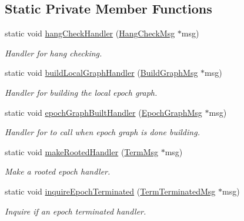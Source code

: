 \subsection*{Static Private Member Functions}
\begin{DoxyCompactItemize}
\item 
static void \hyperlink{structvt_1_1term_1_1_termination_detector_af9fd292c8d1bcc5eba9ee1fb39c29ea2}{hang\+Check\+Handler} (\hyperlink{structvt_1_1term_1_1_hang_check_msg}{Hang\+Check\+Msg} $\ast$msg)
\begin{DoxyCompactList}\small\item\em Handler for hang checking. \end{DoxyCompactList}\item 
static void \hyperlink{structvt_1_1term_1_1_termination_detector_adb3b87cb03a5991e059bb7930ec5d682}{build\+Local\+Graph\+Handler} (\hyperlink{structvt_1_1term_1_1_build_graph_msg}{Build\+Graph\+Msg} $\ast$msg)
\begin{DoxyCompactList}\small\item\em Handler for building the local epoch graph. \end{DoxyCompactList}\item 
static void \hyperlink{structvt_1_1term_1_1_termination_detector_a5a8084f2dc7df36da7e78d088ae8cae9}{epoch\+Graph\+Built\+Handler} (\hyperlink{structvt_1_1term_1_1_termination_detector_aec8abc5a3b161ac7df73ff3ba385dace}{Epoch\+Graph\+Msg} $\ast$msg)
\begin{DoxyCompactList}\small\item\em Handler for to call when epoch graph is done building. \end{DoxyCompactList}\item 
static void \hyperlink{structvt_1_1term_1_1_termination_detector_a3290a7d57d60b0877a39379945303675}{make\+Rooted\+Handler} (\hyperlink{structvt_1_1term_1_1_term_msg}{Term\+Msg} $\ast$msg)
\begin{DoxyCompactList}\small\item\em Make a rooted epoch handler. \end{DoxyCompactList}\item 
static void \hyperlink{structvt_1_1term_1_1_termination_detector_a77d03435714d4abea092f464c42af1f0}{inquire\+Epoch\+Terminated} (\hyperlink{structvt_1_1term_1_1_term_terminated_msg}{Term\+Terminated\+Msg} $\ast$msg)
\begin{DoxyCompactList}\small\item\em Inquire if an epoch terminated handler. \end{DoxyCompactList}\item 

\end{DoxyCompactItemize}
